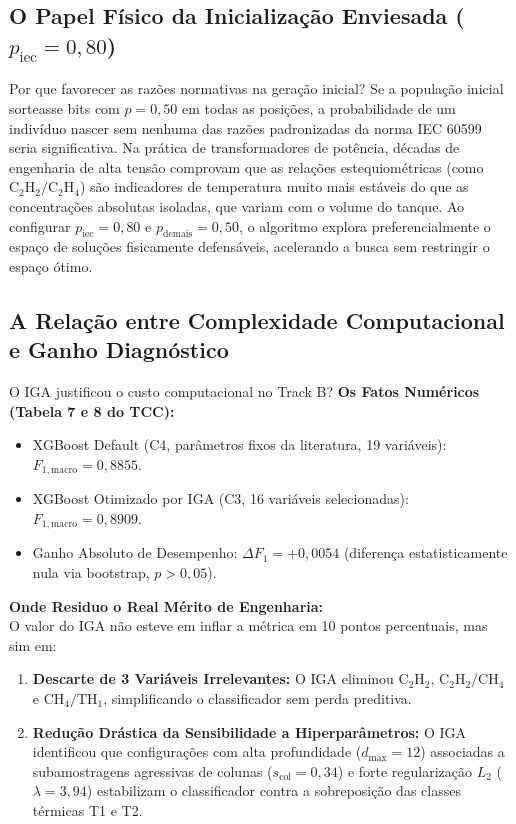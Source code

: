 \documentclass[11pt,a4paper]{article}
\begin{document}
\subsection{O Papel Físico da Inicialização Enviesada \texorpdfstring{($p_{\text{iec}} = 0{,}80$)}{(p\_iec = 0.80)}}
\begin{decisionBox}{Por que favorecer as razões normativas na geração inicial?}
Se a população inicial sorteasse bits com $p = 0{,}50$ em todas as posições, a probabilidade de um indivíduo nascer sem nenhuma das razões padronizadas da norma IEC 60599 seria significativa.
Na prática de transformadores de potência, décadas de engenharia de alta tensão comprovam que as relações estequiométricas (como $\text{C}_2\text{H}_2/\text{C}_2\text{H}_4$) são indicadores de temperatura muito mais estáveis do que as concentrações absolutas isoladas, que variam com o volume do tanque. Ao configurar $p_{\text{iec}} = 0{,}80$ e $p_{\text{demais}} = 0{,}50$, o algoritmo explora preferencialmente o espaço de soluções fisicamente defensáveis, acelerando a busca sem restringir o espaço ótimo.
\end{decisionBox}

\subsection{A Relação entre Complexidade Computacional e Ganho Diagnóstico}
\begin{decisionBox}{O IGA justificou o custo computacional no Track B?}
\textbf{Os Fatos Numéricos (Tabela 7 e 8 do TCC):}
\begin{itemize}
  \item XGBoost Default (C4, parâmetros fixos da literatura, 19 variáveis): $F_{1, \text{macro}} = 0{,}8855$.
  \item XGBoost Otimizado por IGA (C3, 16 variáveis selecionadas): $F_{1, \text{macro}} = 0{,}8909$.
  \item Ganho Absoluto de Desempenho: $\Delta F_1 = +0{,}0054$ (diferença estatisticamente nula via bootstrap, $p > 0{,}05$).
\end{itemize}
\textbf{Onde Residuo o Real Mérito de Engenharia:}\\
O valor do IGA não esteve em inflar a métrica em 10 pontos percentuais, mas sim em:
\begin{enumerate}
  \item \textbf{Descarte de 3 Variáveis Irrelevantes:} O IGA eliminou $\text{C}_2\text{H}_2$, $\text{C}_2\text{H}_2/\text{CH}_4$ e $\text{CH}_4/\text{TH}_1$, simplificando o classificador sem perda preditiva.
  \item \textbf{Redução Drástica da Sensibilidade a Hiperparâmetros:} O IGA identificou que configurações com alta profundidade ($d_{\max} = 12$) associadas a subamostragens agressivas de colunas ($s_{\text{col}} = 0{,}34$) e forte regularização $L_2$ ($\lambda = 3{,}94$) estabilizam o classificador contra a sobreposição das classes térmicas T1 e T2.
\end{enumerate}
\end{decisionBox}
\end{document}
